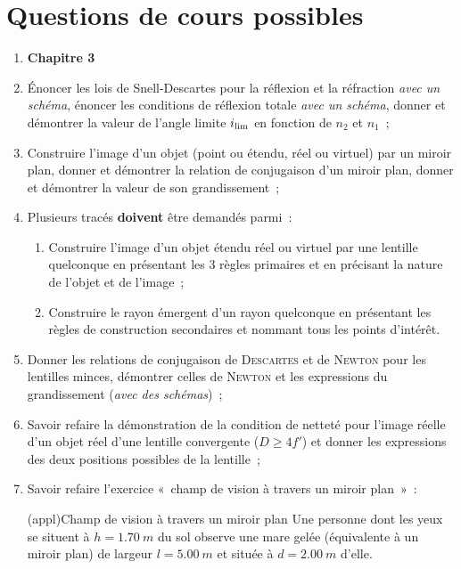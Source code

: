 \documentclass[a4paper, 12pt, final, garamond]{book}
\begin{document}
\section{Questions de cours possibles}
\begin{enumerate}
	\item [] \textbf{Chapitre 3}
	\item Énoncer les lois de Snell-Descartes pour la réflexion et la réfraction
	      \textit{avec un schéma}, énoncer les conditions de réflexion totale
	      \textit{avec un schéma}, donner et démontrer la valeur de l'angle limite
	      $i_{\rm lim}$ en fonction de $n_2$ et $n_1$~;
	\item Construire l'image d'un objet (point ou étendu, réel ou virtuel) par
	      un miroir plan, donner et démontrer la relation de conjugaison d'un
	      miroir plan, donner et démontrer la valeur de son grandissement~;
	\item Plusieurs tracés \textbf{doivent} être demandés parmi~:
	      \begin{enumerate}
		      \item Construire l'image d'un objet étendu réel ou virtuel par une
		            lentille quelconque en présentant les 3 règles primaires et en
		            précisant la nature de l'objet et de l'image~;
		      \item Construire le rayon émergent d'un rayon quelconque en
		            présentant les règles de construction secondaires et nommant
		            tous les points d'intérêt.
	      \end{enumerate}
	\item Donner les relations de conjugaison de \textsc{Descartes} et de
	      \textsc{Newton} pour les lentilles minces, démontrer celles de
	      \textsc{Newton} et les expressions du grandissement (\textit{avec des
		      schémas})~;
	\item Savoir refaire la démonstration de la condition de netteté pour
	      l'image réelle d'un objet réel d'une lentille convergente ($D \geq 4f'$)
	      et donner les expressions des deux positions possibles de la lentille~;
	\item Savoir refaire l'exercice «~champ de vision à travers un miroir plan~»~:
	      \begin{tcb}(appl){Champ de vision à travers un miroir plan}
		      Une personne dont les yeux se situent à $h = \SI{1.70}{m}$ du sol
		      observe une mare gelée (équivalente à un miroir plan) de largeur $l =
			      \SI{5.00}{m}$ et située à $d = \SI{2.00}{m}$ d'elle.

\end{tcb}
\end{enumerate}
\end{document}
